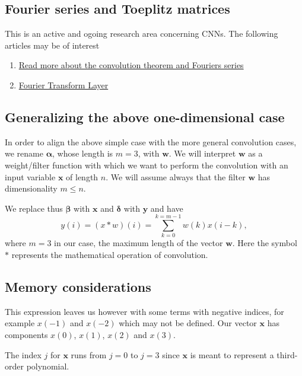 \documentclass[%
oneside,                 %
final,                   %
10pt]{article}
\begin{document}
\subsection{Fourier series and Toeplitz matrices}

This is an active and ogoing research area concerning CNNs. The following articles may be of interest
\begin{enumerate}
\item \href{{https://www.sciencedirect.com/topics/engineering/convolution-theorem#:~:text=The%20convolution%20theorem%20(together%20with,k%20)%20G%20(%20k%20)%20.}}{Read more about the convolution theorem and Fouriers series}

\item \href{{https://www.sciencedirect.com/science/article/pii/S1568494623006257}}{Fourier Transform Layer}
\end{enumerate}

\noindent
\subsection{Generalizing the above one-dimensional case}

In order to align the above simple case with the more general
convolution cases, we rename $\bm{\alpha}$, whose length is $m=3$,
with $\bm{w}$.  We will interpret $\bm{w}$ as a weight/filter function
with which we want to perform the convolution with an input variable
$\bm{x}$ of length $n$.  We will assume always that the filter
$\bm{w}$ has dimensionality $m \le n$.

We replace thus $\bm{\beta}$ with $\bm{x}$ and $\bm{\delta}$ with $\bm{y}$ and have
\[
y(i)= \left(x*w\right)(i)= \sum_{k=0}^{k=m-1}w(k)x(i-k),
\]
where $m=3$ in our case, the maximum length of the vector $\bm{w}$.
Here the symbol $*$ represents the mathematical operation of convolution.

\subsection{Memory considerations}

This expression leaves us however with some terms with negative
indices, for example $x(-1)$ and $x(-2)$ which may not be defined. Our
vector $\bm{x}$ has components $x(0)$, $x(1)$, $x(2)$ and $x(3)$.

The index $j$ for $\bm{x}$ runs from $j=0$ to $j=3$ since $\bm{x}$ is meant to
represent a third-order polynomial.
\end{document}
